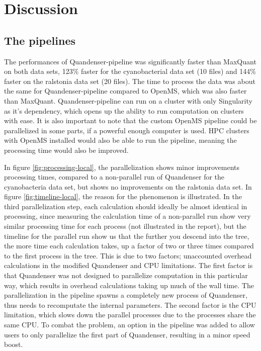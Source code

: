 \section{Discussion}

\subsection{The pipelines}
The performances of Quandenser-pipeline was significantly faster than MaxQuant on both data sets, 123\% faster for the cyanobacterial data set (10 files) and 144\% faster on the ralstonia data set (20 files). The time to process the data was about the same for Quandenser-pipeline compared to OpenMS, which was also faster than MaxQuant. Quandenser-pipeline can run on a cluster with only Singularity as it's dependency, which opens up the ability to run computation on clusters with ease. It is also important to note that the custom OpenMS pipeline could be parallelized in some parts, if a powerful enough computer is used. HPC clusters with OpenMS installed would also be able to run the pipeline, meaning the processing time would also be improved.

In figure \ref{fig:processing-local}, the parallelization shows minor improvements processing times, compared to a non-parallel run of Quandenser for the cyanobacteria data set, but shows no improvements on the ralstonia data set. In figure \ref{fig:timeline-local}, the reason for the phenomenon is illustrated. In the third parallelization step, each calculation should ideally be almost identical in processing, since measuring the calculation time of a non-parallel run show very similar processing time for each process (not illustrated in the report), but the timeline for the parallel run show us that the further you descend into the tree, the more time each calculation takes, up a factor of two or three times compared to the first process in the tree. This is due to two factors; unaccounted overhead calculations in the modified Quandenser and CPU limitations. The first factor is that Quandenser was not designed to parallelize computation in this particular way, which results in overhead calculations taking up much of the wall time. The parallelization in the pipeline spawns a completely new process of Quandenser, thus needs to recomputate the internal parameters. The second factor is the CPU limitation, which slows down the parallel processes due to the processes share the same CPU. To combat the problem, an option in the pipeline was added to allow users to only parallelize the first part of Quandenser, resulting in a minor speed boost.

